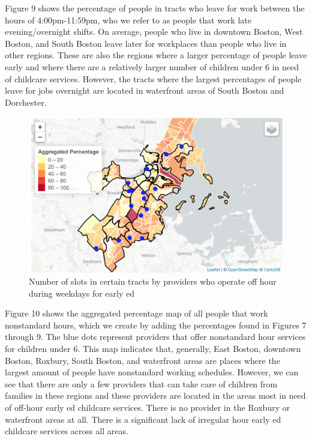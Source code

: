 \documentclass[10pt,letterpaper]{article}
\begin{document}
Figure 9 shows the percentage of people in tracts who leave for work
between the hours of 4:00pm-11:59pm, who we refer to as people that work
late evening/overnight shifts. On average, people who live in downtown
Boston, West Boston, and South Boston leave later for workplaces than
people who live in other regions. These are also the regions where a
larger percentage of people leave early and where there are a relatively
larger number of children under 6 in need of childcare services.
However, the tracts where the largest percentages of people leave for
jobs overnight are located in waterfront areas of South Boston and
Dorchester.

\begin{figure}

{\centering \includegraphics[width=1\linewidth]{aggregatehourdemand} 

}

\caption{Number of slots in certain tracts by providers who operate off hour during weekdays for early ed}\label{fig:unnamed-chunk-12}
\end{figure}

Figure 10 shows the aggregated percentage map of all people that work
nonstandard hours, which we create by adding the percentages found in
Figures 7 through 9. The blue dots represent providers that offer
nonstandard hour services for children under 6. This map indicates that,
generally, East Boston, downtown Boston, Roxbury, South Boston, and
waterfront areas are places where the largest amount of people have
nonstandard working schedules. However, we can see that there are only a
few providers that can take care of children from families in these
regions and these providers are located in the areas most in need of
off-hour early ed childcare services. There is no provider in the
Roxbury or waterfront areas at all. There is a significant lack of
irregular hour early ed childcare services across all areas.
\end{document}
